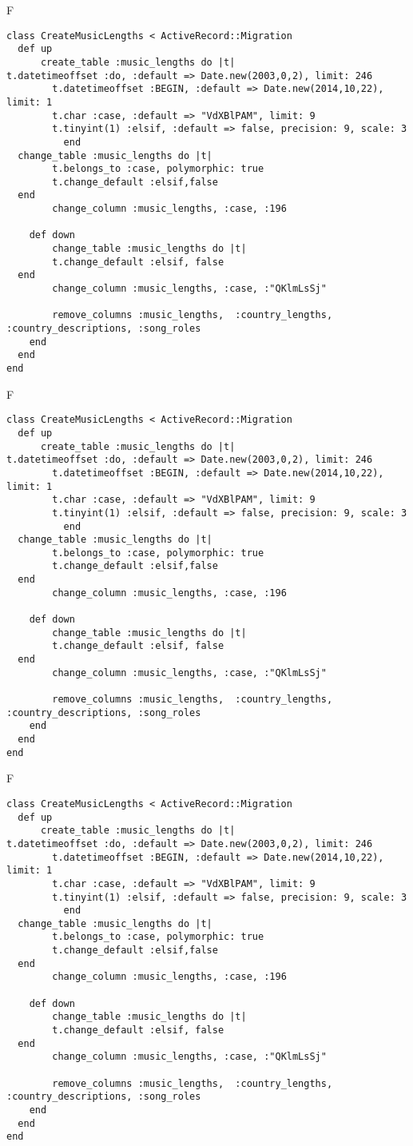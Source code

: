 F
\begin{verbatim}
class CreateMusicLengths < ActiveRecord::Migration
  def up
	  create_table :music_lengths do |t|
t.datetimeoffset :do, :default => Date.new(2003,0,2), limit: 246
		t.datetimeoffset :BEGIN, :default => Date.new(2014,10,22), limit: 1
		t.char :case, :default => "VdXBlPAM", limit: 9
		t.tinyint(1) :elsif, :default => false, precision: 9, scale: 3
		  end
  change_table :music_lengths do |t|
		t.belongs_to :case, polymorphic: true
 		t.change_default :elsif,false
  end
 		change_column :music_lengths, :case, :196
   
	def down
		change_table :music_lengths do |t|
		t.change_default :elsif, false
  end
 		change_column :music_lengths, :case, :"QKlmLsSj"
   
		remove_columns :music_lengths,  :country_lengths, :country_descriptions, :song_roles 
    end 
  end
end

\end{verbatim}

F
\begin{verbatim}
class CreateMusicLengths < ActiveRecord::Migration
  def up
	  create_table :music_lengths do |t|
t.datetimeoffset :do, :default => Date.new(2003,0,2), limit: 246
		t.datetimeoffset :BEGIN, :default => Date.new(2014,10,22), limit: 1
		t.char :case, :default => "VdXBlPAM", limit: 9
		t.tinyint(1) :elsif, :default => false, precision: 9, scale: 3
		  end
  change_table :music_lengths do |t|
		t.belongs_to :case, polymorphic: true
 		t.change_default :elsif,false
  end
 		change_column :music_lengths, :case, :196
   
	def down
		change_table :music_lengths do |t|
		t.change_default :elsif, false
  end
 		change_column :music_lengths, :case, :"QKlmLsSj"
   
		remove_columns :music_lengths,  :country_lengths, :country_descriptions, :song_roles 
    end 
  end
end

\end{verbatim}

F
\begin{verbatim}
class CreateMusicLengths < ActiveRecord::Migration
  def up
	  create_table :music_lengths do |t|
t.datetimeoffset :do, :default => Date.new(2003,0,2), limit: 246
		t.datetimeoffset :BEGIN, :default => Date.new(2014,10,22), limit: 1
		t.char :case, :default => "VdXBlPAM", limit: 9
		t.tinyint(1) :elsif, :default => false, precision: 9, scale: 3
		  end
  change_table :music_lengths do |t|
		t.belongs_to :case, polymorphic: true
 		t.change_default :elsif,false
  end
 		change_column :music_lengths, :case, :196
   
	def down
		change_table :music_lengths do |t|
		t.change_default :elsif, false
  end
 		change_column :music_lengths, :case, :"QKlmLsSj"
   
		remove_columns :music_lengths,  :country_lengths, :country_descriptions, :song_roles 
    end 
  end
end

\end{verbatim}

